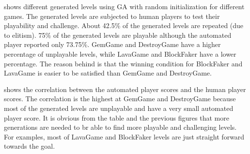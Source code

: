  shows different generated levels using GA with random initialization for different games. The generated levels are subjected to human players to test their playability and challenge. About 42.5\% of the generated levels are repeated (due to elitism). 75\% of the generated levels are playable although the automated player reported only 73.75\%. GemGame and DestroyGame have a higher percentage of unplayable levels, while LavaGame and BlockFaker have a lower percentage. The reason behind is that the winning condition for BlockFaker and LavaGame is easier to be satisfied than GemGame and DestroyGame.\\\par 

 shows the correlation between the automated player scores and the human player scores. The correlation is the highest at GemGame and DestroyGame because most of the generated levels are unplayable and have a very small automated player score. It is obvious from the table and the previous figures that more generations are needed to br able to find more playable and challenging levels. For examples, most of LavaGame and BlockFaker levels are just straight forward towards the goal.

